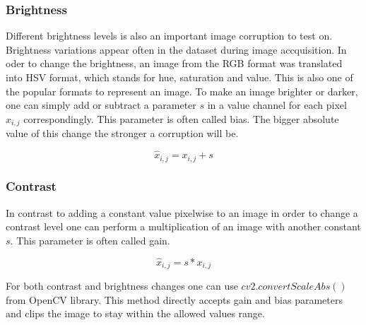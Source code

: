 \subsubsection{Brightness}
Different brightness levels is also an important image corruption to test on. Brightness variations appear often in the dataset during image accquisition. In oder to change the brightness, an image from the RGB format was translated into HSV format, which stands for hue, saturation and value. This is also one of the popular formats to represent an image. To make an image brighter or darker, one can simply add or subtract a parameter $s$ in a value channel for each pixel $x_{i,j}$ correspondingly. This parameter is often called bias. The bigger absolute value of this change the stronger a corruption will be.

\begin{equation}
    \hat{x}_{i, j} = x_{i, j} + s
\end{equation}

\subsubsection{Contrast}
In contrast to adding a constant value pixelwise to an image in order to change a contrast level one can perform a multiplication of an image with another constant $s$. This parameter is often called gain.

\begin{equation}
    \hat{x}_{i, j} = s * x_{i, j}
\end{equation}

For both contrast and brightness changes one can use $cv2.convertScaleAbs()$ from OpenCV library. This method directly accepts gain and bias parameters and clips the image to stay within the allowed values range.

